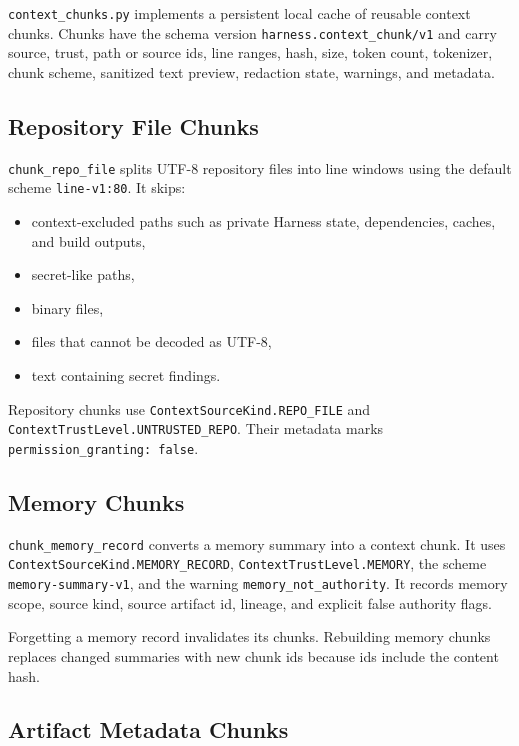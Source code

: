 \documentclass[11pt]{article}
\begin{document}
\texttt{context\_chunks.py} implements a persistent local cache of reusable context chunks. Chunks have the schema version \texttt{harness.context\_chunk/v1} and carry source, trust, path or source ids, line ranges, hash, size, token count, tokenizer, chunk scheme, sanitized text preview, redaction state, warnings, and metadata.

\subsection{Repository File Chunks}

\texttt{chunk\_repo\_file} splits UTF-8 repository files into line windows using the default scheme \texttt{line-v1:80}. It skips:

\begin{itemize}[leftmargin=*]
  \item context-excluded paths such as private Harness state, dependencies, caches, and build outputs,
  \item secret-like paths,
  \item binary files,
  \item files that cannot be decoded as UTF-8,
  \item text containing secret findings.
\end{itemize}

Repository chunks use \texttt{ContextSourceKind.REPO\_FILE} and \texttt{ContextTrustLevel.UNTRUSTED\_REPO}. Their metadata marks \texttt{permission\_granting: false}.

\subsection{Memory Chunks}

\texttt{chunk\_memory\_record} converts a memory summary into a context chunk. It uses \texttt{ContextSourceKind.MEMORY\_RECORD}, \texttt{ContextTrustLevel.MEMORY}, the scheme \texttt{memory-summary-v1}, and the warning \texttt{memory\_not\_authority}. It records memory scope, source kind, source artifact id, lineage, and explicit false authority flags.

Forgetting a memory record invalidates its chunks. Rebuilding memory chunks replaces changed summaries with new chunk ids because ids include the content hash.

\subsection{Artifact Metadata Chunks}
\end{document}
